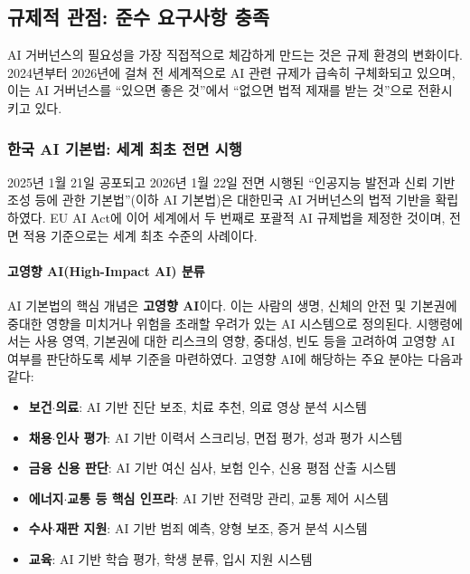 \subsection{규제적 관점: 준수 요구사항 충족}

AI 거버넌스의 필요성을 가장 직접적으로 체감하게 만드는 것은 규제 환경의 변화이다. 2024년부터 2026년에 걸쳐 전 세계적으로 AI 관련 규제가 급속히 구체화되고 있으며, 이는 AI 거버넌스를 ``있으면 좋은 것''에서 ``없으면 법적 제재를 받는 것''으로 전환시키고 있다.\cite{smuha2021race, buiten2019towards}

\subsubsection*{한국 AI 기본법: 세계 최초 전면 시행}

2025년 1월 21일 공포되고 2026년 1월 22일 전면 시행된 ``인공지능 발전과 신뢰 기반 조성 등에 관한 기본법''(이하 AI 기본법)은 대한민국 AI 거버넌스의 법적 기반을 확립하였다.\cite{cset2025korea_ai_act} EU AI Act에 이어 세계에서 두 번째로 포괄적 AI 규제법을 제정한 것이며, 전면 적용 기준으로는 세계 최초 수준의 사례이다.

\paragraph{고영향 AI(High-Impact AI) 분류}
AI 기본법의 핵심 개념은 \textbf{고영향 AI}이다. 이는 사람의 생명, 신체의 안전 및 기본권에 중대한 영향을 미치거나 위험을 초래할 우려가 있는 AI 시스템으로 정의된다. 시행령에서는 사용 영역, 기본권에 대한 리스크의 영향, 중대성, 빈도 등을 고려하여 고영향 AI 여부를 판단하도록 세부 기준을 마련하였다. 고영향 AI에 해당하는 주요 분야는 다음과 같다:

\begin{itemize}
    \item \textbf{보건$\cdot$의료}: AI 기반 진단 보조, 치료 추천, 의료 영상 분석 시스템
    \item \textbf{채용$\cdot$인사 평가}: AI 기반 이력서 스크리닝, 면접 평가, 성과 평가 시스템
    \item \textbf{금융 신용 판단}: AI 기반 여신 심사, 보험 인수, 신용 평점 산출 시스템
    \item \textbf{에너지$\cdot$교통 등 핵심 인프라}: AI 기반 전력망 관리, 교통 제어 시스템
    \item \textbf{수사$\cdot$재판 지원}: AI 기반 범죄 예측, 양형 보조, 증거 분석 시스템
    \item \textbf{교육}: AI 기반 학습 평가, 학생 분류, 입시 지원 시스템
\end{itemize}

